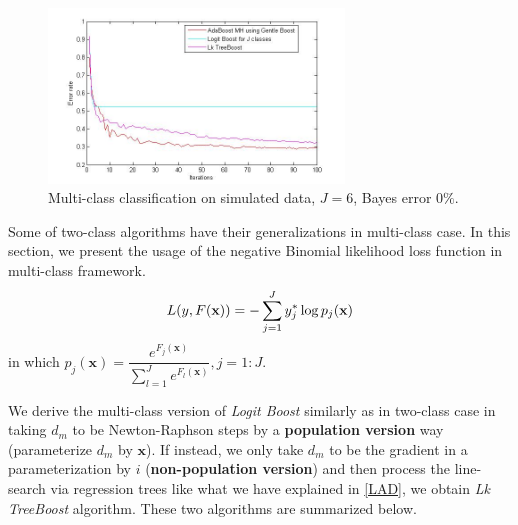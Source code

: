 \documentclass[a4paper,twoside,12pt]{article}
\begin{document}
\begin{figure}[ht]\centering
  	\includegraphics[width=0.7\textwidth]{multi_comp3.jpg}
  	\caption{Multi-class classification on simulated data, $J = 6$, Bayes error $0\%$.}
  	\label{multi_comp3}
\end{figure}

Some of two-class algorithms have their generalizations in multi-class case. In this section, we present the usage of the negative Binomial likelihood loss function in multi-class framework.
\begin{align}
    L(y, F(\textbf{x})) = -\sum\limits_{j=1}^J y_j^{*}\log p_j(\textbf{x}) \notag
\end{align}
in which $p_j(\textbf{x}) = \dfrac{e^{F_j(\textbf{x})}}{\sum\limits_{l=1}^J e^{F_l(\textbf{x})}}, j = 1:J$.

We derive the multi-class version of \textsl{Logit Boost} similarly as in two-class case in taking $d_m$ to be Newton-Raphson steps by a \textbf{population version} way (parameterize $d_m$ by $\textbf{x}$). If instead, we only take $d_m$ to be the gradient in a parameterization by $i$ (\textbf{non-population version}) and then process the line-search via regression trees like what we have explained in \ref{LAD}, we obtain \textsl{Lk TreeBoost} algorithm. These two algorithms are summarized below.

\begin{center}
\end{center}
\end{document}
